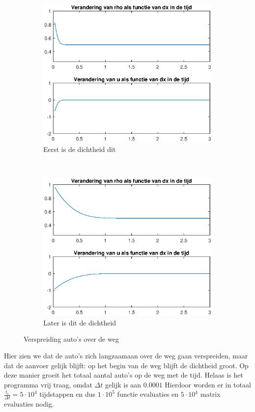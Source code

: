 \documentclass{article}
\newcommand{\Dt}{\Delta t}
\begin{document}
\begin{figure}[H]
  \centering
  \begin{subfigure}{0.7\textwidth}
  \includegraphics[width=\textwidth]{ss31.eps}
  \caption{Eerst is de dichtheid dit}
  \end{subfigure}
  ~
  \begin{subfigure}{0.7\textwidth}
  \includegraphics[width=\textwidth]{ss33.eps}
  \caption{Later is dit de dichtheid}
  \end{subfigure}
  \caption{Verspreiding auto's over de weg}
  \label{fig:scrshots}
\end{figure}
\vspace{-10pt}
Hier zien we dat de auto's zich langzaamaan over de weg gaan verspreiden, maar dat de aanvoer gelijk blijft: op het begin van de weg blijft de dichtheid groot.
Op deze manier groeit het totaal aantal auto's op de weg met de tijd.
Helaas is het programma vrij traag, omdat $\Dt$ gelijk is aan $0.0001$ Hierdoor worden er in totaal \(\frac{t_e}{\Dt}=5\cdot10^4\) tijdstappen en dus \(1\cdot10^5\) functie evaluaties en \(5\cdot10^4\) matrix evaluaties nodig.
\end{document}

